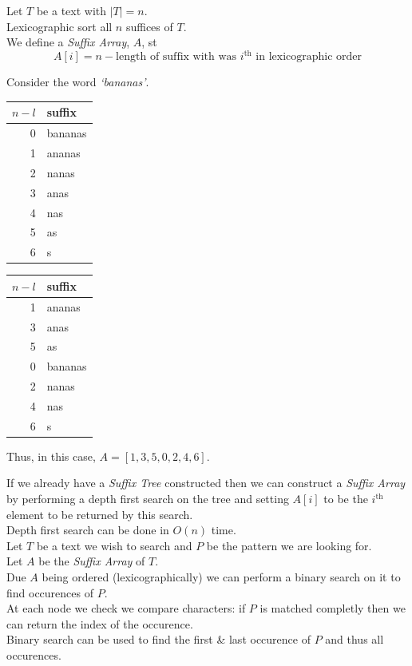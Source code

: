 \documentclass[11pt,a4paper]{article}
\begin{document}
Let $T$ be a text with $|T|=n$.\\
Lexicographic sort all $n$ suffices of $T$.\\
We define a \textit{Suffix Array}, $A$, st
$$A[i]=n-\text{length of suffix with was }i^\text{th}\text{ in lexicographic order}$$

Consider the word \textit{`bananas'}.
\begin{center}
\begin{tabular}{|r|l|}
\hline
$n-l$&\textbf{suffix}\\\hline
0&bananas\\
1&ananas\\
2&nanas\\
3&anas\\
4&nas\\
5&as\\
6&s\\
\hline
\end{tabular}\quad
\begin{tabular}{|r|l|}
\hline
$n-l$&\textbf{suffix}\\\hline
\hline
1&ananas\\
3&anas\\
5&as\\
0&bananas\\
2&nanas\\
4&nas\\
6&s\\
\hline
\end{tabular}
\end{center}
Thus, in this case, $A=[1,3,5,0,2,4,6]$.\\


If we already have a \textit{Suffix Tree} constructed then we can construct a \textit{Suffix Array} by performing a depth first search on the tree and setting $A[i]$ to be the $i^\text{th}$ element to be returned by this search.\\
\nb Depth first search can be done in $O(n)$ time.\\

Let $T$ be a text we wish to search and $P$ be the pattern we are looking for.\\
Let $A$ be the \textit{Suffix Array} of $T$.\\
Due $A$ being ordered (lexicographically) we can perform a binary search on it to find occurences of $P$.\\
At each node we check we compare characters: if $P$ is matched completly then we can return the index of the occurence.\\
\nb Binary search can be used to find the first \& last occurence of $P$ and thus all occurences.\\
\end{document}

